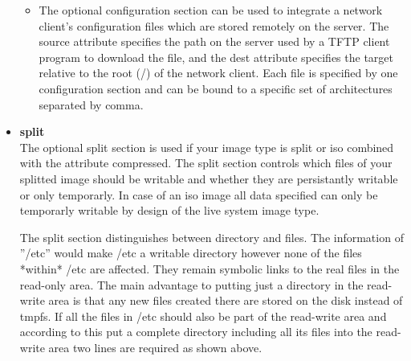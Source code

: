 \begin{itemize}
\begin {itemize}
      mapper setup with the dmsquash type. In this case, KIWI creates an
      additional write partition, then
      combines both partitions with the given overlay filesystem or device map.
      Currently, there are two such filesystems: unionfs and aufs
      (aufs is the preferred file system). The partition that holds the
      read-only system image must be set as the ro attribute value, and the
      partition that serves as the write partition must be set the rw
      attribute value.
	\item The optional configuration section can be used to integrate a network
      client's configuration files which are stored remotely on the server.
      The source attribute specifies the path on the server used by a
      TFTP client program to download the file, and the dest attribute
      specifies the target relative to the root (/) of the network client.
      Each file is specified by one configuration section and can be
      bound to a specific set of architectures separated by comma.
	\end{itemize}

\item \textbf{split}\\
	The optional split section is used if your image type is split or iso
	combined with the attribute compressed. The split
	section controls which files of your splitted image should be writable
	and whether they are persistantly writable or only temporarly. In case
	of an iso image all data specified can only be temporarly writable
	by design of the live system image type.

	The split section distinguishes between directory and files. The
	information of ''/etc'' would make /etc a writable directory however
	none of the files *within* /etc are affected. They remain symbolic
	links to the real files in the read-only area. The main advantage to
	putting just a directory in the read-write area is that any new
	files created there are stored on the disk instead of tmpfs. If all
	the files in /etc should also be part of the read-write area and
	according to this put a complete directory including all its files
	into the read-write area two lines are required as shown above.


\end{itemize}
